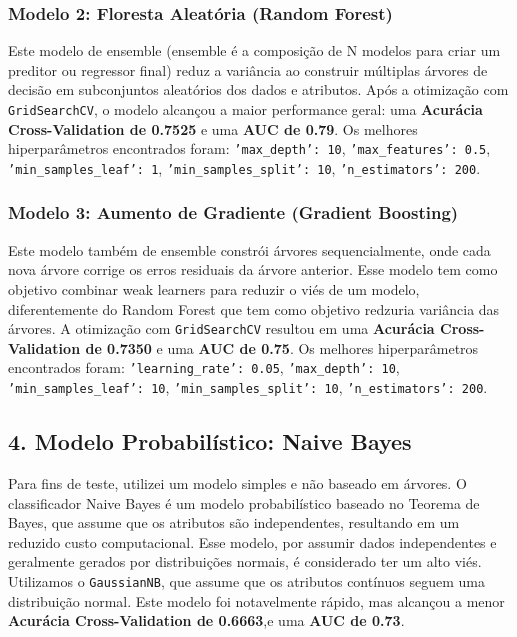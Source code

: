 \subsubsection*{Modelo 2: Floresta Aleatória (Random Forest)}
Este modelo de ensemble (ensemble é a composição de N modelos para criar um preditor ou regressor final) reduz a variância ao construir múltiplas árvores de decisão em subconjuntos aleatórios dos dados e atributos.
Após a otimização com \texttt{GridSearchCV}, o modelo alcançou a maior performance geral: uma \textbf{Acurácia Cross-Validation de 0.7525}  e uma \textbf{AUC de 0.79}. 
Os melhores hiperparâmetros encontrados foram: \texttt{'max\_depth': 10}, \texttt{'max\_features': 0.5}, \texttt{'min\_samples\_leaf': 1}, \texttt{'min\_samples\_split': 10}, \texttt{'n\_estimators': 200}.
\vspace{5mm}
\subsubsection*{Modelo 3: Aumento de Gradiente (Gradient Boosting)}
Este modelo também de ensemble constrói árvores sequencialmente, onde cada nova árvore corrige os erros residuais da árvore anterior. Esse modelo tem como objetivo combinar weak learners para reduzir o viés de um modelo, diferentemente do Random Forest que tem como objetivo redzuria  variância das árvores.
A otimização com \texttt{GridSearchCV} resultou em uma \textbf{Acurácia Cross-Validation de 0.7350}  e uma \textbf{AUC de 0.75}.
Os melhores hiperparâmetros encontrados foram: \texttt{'learning\_rate': 0.05}, \texttt{'max\_depth': 10}, \texttt{'min\_samples\_leaf': 10}, \texttt{'min\_samples\_split': 10}, \texttt{'n\_estimators': 200}.
\vspace{5mm}
\subsection*{4. Modelo Probabilístico: Naive Bayes}
Para fins de teste, utilizei um modelo simples e não baseado em árvores. O classificador Naive Bayes é um modelo probabilístico baseado no Teorema de Bayes, que assume que os atributos são independentes, resultando em um reduzido custo computacional. Esse modelo, por assumir dados independentes e geralmente gerados por distribuições normais, é considerado ter um alto viés.
Utilizamos o \texttt{GaussianNB}, que assume que os atributos contínuos seguem uma distribuição normal.
Este modelo foi notavelmente rápido, mas alcançou a menor \textbf{Acurácia Cross-Validation de 0.6663},e uma \textbf{AUC de 0.73}.
\vspace{5mm}
